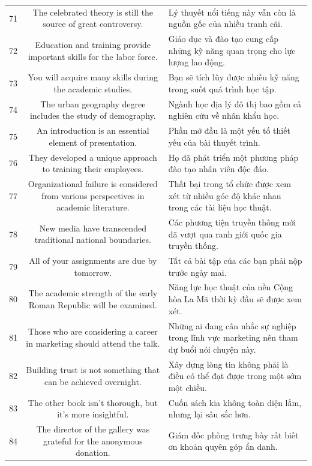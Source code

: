 \documentclass[11pt,a4paper]{article}
\begin{document}
\begin{longtable}{N S M}
71 & The celebrated theory is still the source of great controversy. & Lý thuyết nổi tiếng này vẫn còn là nguồn gốc của nhiều tranh cãi. \\
72 & Education and training provide important skills for the labor force. & Giáo dục và đào tạo cung cấp những kỹ năng quan trọng cho lực lượng lao động. \\
73 & You will acquire many skills during the academic studies. & Bạn sẽ tích lũy được nhiều kỹ năng trong suốt quá trình học tập. \\
74 & The urban geography degree includes the study of demography. & Ngành học địa lý đô thị bao gồm cả nghiên cứu về nhân khẩu học. \\
75 & An introduction is an essential element of presentation. & Phần mở đầu là một yếu tố thiết yếu của bài thuyết trình. \\
76 & They developed a unique approach to training their employees. & Họ đã phát triển một phương pháp đào tạo nhân viên độc đáo. \\
77 & Organizational failure is considered from various perspectives in academic literature. & Thất bại trong tổ chức được xem xét từ nhiều góc độ khác nhau trong các tài liệu học thuật. \\
78 & New media have transcended traditional national boundaries. & Các phương tiện truyền thông mới đã vượt qua ranh giới quốc gia truyền thống. \\
79 & All of your assignments are due by tomorrow. & Tất cả bài tập của các bạn phải nộp trước ngày mai. \\
80 & The academic strength of the early Roman Republic will be examined. & Năng lực học thuật của nền Cộng hòa La Mã thời kỳ đầu sẽ được xem xét. \\
81 & Those who are considering a career in marketing should attend the talk. & Những ai đang cân nhắc sự nghiệp trong lĩnh vực marketing nên tham dự buổi nói chuyện này. \\
82 & Building trust is not something that can be achieved overnight. & Xây dựng lòng tin không phải là điều có thể đạt được trong một sớm một chiều. \\
83 & The other book isn't thorough, but it's more insightful. & Cuốn sách kia không toàn diện lắm, nhưng lại sâu sắc hơn. \\
84 & The director of the gallery was grateful for the anonymous donation. & Giám đốc phòng trưng bày rất biết ơn khoản quyên góp ẩn danh. \\

\end{longtable}
\end{document}
